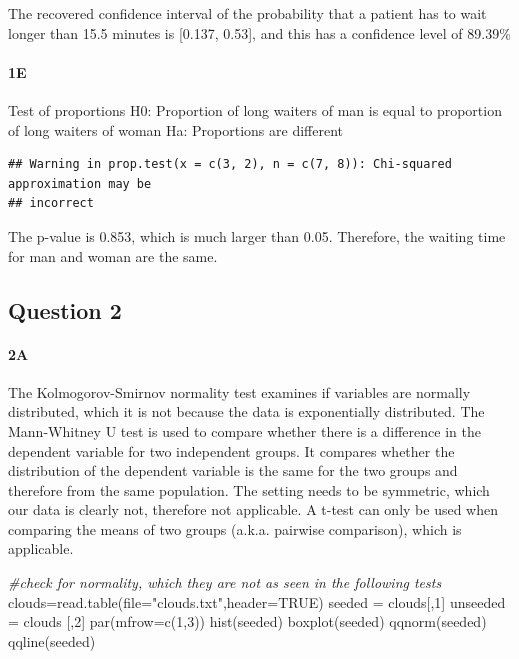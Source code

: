 \documentclass[
]{article}
\newenvironment{Shaded}{\begin{snugshade}}{\end{snugshade}}
\newcommand{\AttributeTok}[1]{\textcolor[rgb]{0.77,0.63,0.00}{#1}}
\newcommand{\CommentTok}[1]{\textcolor[rgb]{0.56,0.35,0.01}{\textit{#1}}}
\newcommand{\ConstantTok}[1]{\textcolor[rgb]{0.00,0.00,0.00}{#1}}
\newcommand{\DecValTok}[1]{\textcolor[rgb]{0.00,0.00,0.81}{#1}}
\newcommand{\FunctionTok}[1]{\textcolor[rgb]{0.00,0.00,0.00}{#1}}
\newcommand{\NormalTok}[1]{#1}
\newcommand{\OtherTok}[1]{\textcolor[rgb]{0.56,0.35,0.01}{#1}}
\newcommand{\StringTok}[1]{\textcolor[rgb]{0.31,0.60,0.02}{#1}}
\begin{document}
The recovered confidence interval of the probability that a patient has
to wait longer than 15.5 minutes is {[}0.137, 0.53{]}, and this has a
confidence level of 89.39\%

\hypertarget{e}{%
\paragraph{\texorpdfstring{\textbf{1E}}{1E}}\label{e}}

Test of proportions H0: Proportion of long waiters of man is equal to
proportion of long waiters of woman Ha: Proportions are different

\begin{verbatim}
## Warning in prop.test(x = c(3, 2), n = c(7, 8)): Chi-squared approximation may be
## incorrect
\end{verbatim}

The p-value is 0.853, which is much larger than 0.05. Therefore, the
waiting time for man and woman are the same.

\hypertarget{question-2}{%
\subsection{Question 2}\label{question-2}}

\hypertarget{a-1}{%
\paragraph{\texorpdfstring{\textbf{2A}}{2A}}\label{a-1}}

The Kolmogorov-Smirnov normality test examines if variables are normally
distributed, which it is not because the data is exponentially
distributed. The Mann-Whitney U test is used to compare whether there is
a difference in the dependent variable for two independent groups. It
compares whether the distribution of the dependent variable is the same
for the two groups and therefore from the same population. The setting
needs to be symmetric, which our data is clearly not, therefore not
applicable. A t-test can only be used when comparing the means of two
groups (a.k.a. pairwise comparison), which is applicable.

\begin{Shaded}
\begin{Highlighting}[]
\CommentTok{\#check for normality, which they are not as seen in the following tests}
\NormalTok{clouds}\OtherTok{=}\FunctionTok{read.table}\NormalTok{(}\AttributeTok{file=}\StringTok{"clouds.txt"}\NormalTok{,}\AttributeTok{header=}\ConstantTok{TRUE}\NormalTok{)}
\NormalTok{seeded }\OtherTok{=}\NormalTok{ clouds[,}\DecValTok{1}\NormalTok{]}
\NormalTok{unseeded }\OtherTok{=}\NormalTok{ clouds [,}\DecValTok{2}\NormalTok{]}
\FunctionTok{par}\NormalTok{(}\AttributeTok{mfrow=}\FunctionTok{c}\NormalTok{(}\DecValTok{1}\NormalTok{,}\DecValTok{3}\NormalTok{))}
\FunctionTok{hist}\NormalTok{(seeded)}
\FunctionTok{boxplot}\NormalTok{(seeded)}
\FunctionTok{qqnorm}\NormalTok{(seeded)}
\FunctionTok{qqline}\NormalTok{(seeded)}
\end{Highlighting}
\end{Shaded}
\end{document}
